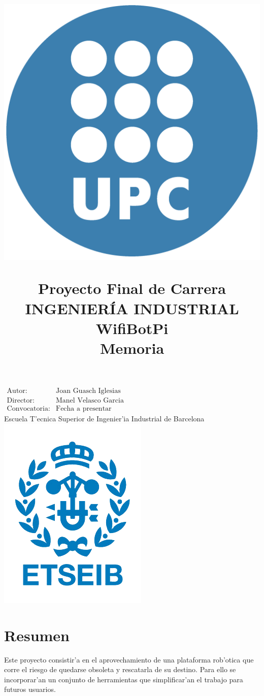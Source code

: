 \documentclass[twoside]{article}
\title{\begin{center} 
\includegraphics[scale=0.05]{images/upc-logo.png} 
\end{center} 
\vspace{0.5cm} 
Proyecto Final de Carrera\\
INGENIER\'IA INDUSTRIAL \\
\vspace{0.5cm} 
\Huge{WifiBotPi} 
\vspace{0.5cm} \\
 Memoria}
\date{} %
\begin{document}
\maketitle
\begin{center}
\large{$\begin{array}{ll}
\mbox{Autor:} & \mbox{Joan Guasch Iglesias} \\
\mbox{Director:} & \mbox{Manel Velasco Garcia} \\
\mbox{Convocatoria:} & \mbox{Fecha a presentar}
\end{array}$}\\ 
\vspace{2cm} 
\Large{Escuela T'ecnica Superior de Ingenier'ia Industrial de Barcelona}\\ \vspace{1cm}
\includegraphics[scale=1]{images/etseib-logo.png}
\end{center}
\thispagestyle{empty}
\newpage

\thispagestyle{empty}
\paragraph*{}
\newpage

\section*{Resumen}
Este proyecto consistir'a en el aprovechamiento de una plataforma rob'otica que corre el riesgo de quedarse obsoleta y rescatarla de su destino. Para ello se incorporar'an un conjunto de herramientas que simplificar'an el trabajo para futuros usuarios.
\newpage
\end{document}
